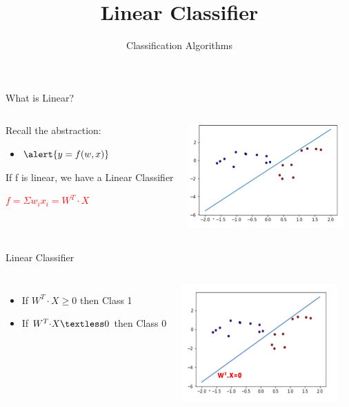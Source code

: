 \documentclass[aspectratio=169, 14pt,usenames,dvipsnames]{beamer}
\title[Linear Classifier]{Linear Classifier}
\begin{document}
{\1
\begin{frame} 
	\subtitle{Classification Algorithms}
	\maketitle
\end{frame}
}

\begin{frame}{What is Linear?}
\begin{columns}
\begin{itemize}
\item  Recall the abstraction:
\begin{itemize}
\item  $ \alert{y=f(w,x)}$
\end{itemize}
\item  If \alert{f} is linear, we have a Linear Classifier
\textcolor{red}{\item $ f = \Sigma w_ix_i = W^T{\cdot}X $}
\end{itemize}
\includegraphics[width=6cm,height=4cm]{Images/2lcla.png}
\end{columns}
\end{frame}



\begin{frame}{Linear Classifier}
\begin{columns}
\begin{itemize}
	\item  If \alert{$ W^T{\cdot}X \geq 0$} then Class 1 \vspace {5pt}
	\item  If \alert{$ W^T{\cdot}X \textless 0$} then Class 0
\end{itemize}
\includegraphics[width=6cm,height=4.5cm]{Images/3lcla.png}
\end{columns}
\end{frame}
\end{document}
